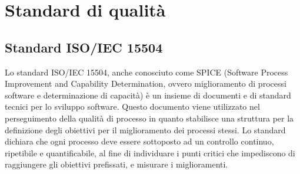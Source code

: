 \newpage
\appendix
\section{Standard di qualità} %

\subsection{Standard ISO/IEC 15504} %
Lo standard ISO/IEC 15504, anche conosciuto come SPICE (Software Process Improvement and Capability Determination, ovvero miglioramento di processi software e determinazione di capacità) è un insieme di documenti e di standard tecnici per lo sviluppo software.
Questo documento viene utilizzato nel perseguimento della qualità di processo in quanto stabilisce una struttura per la definizione degli obiettivi per il miglioramento dei processi stessi.
Lo standard dichiara che ogni processo deve essere sottoposto ad un controllo continuo, ripetibile e quantificabile, al fine di individuare i punti critici che impediscono di raggiungere gli obiettivi prefissati, e misurare i miglioramenti.


